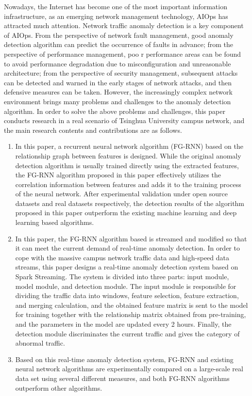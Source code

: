 \begin{abstract*}
  Nowadays, the Internet has become one of the most important information infrastructure, as an emerging network management technology, AIOps has attracted much attention. Network traffic anomaly detection is a key component of AIOps. From the perspective of network fault management, good anomaly detection algorithm can predict the occurrence of faults in advance; from the perspective of performance management, poo r performance areas can be found to avoid performance degradation due to misconfiguration and unreasonable architecture; from the perspective of security management, subsequent attacks can be detected and warned in the early stages of network attacks, and then defensive measures can be taken. However, the increasingly complex network environment brings many problems and challenges to the anomaly detection algorithm. 
  In order to solve the above problems and challenges, this paper conducts research in a real scenario of Tsinghua University campus network, and the main research contents and contributions are as follows.
  \begin{enumerate}
    \item In this paper, a recurrent neural network algorithm (FG-RNN) based on the relationship graph between features is designed. While the original anomaly detection algorithm is usually trained directly using the extracted features, the FG-RNN algorithm proposed in this paper effectively utilizes the correlation information between features and adds it to the training process of the neural network. After experimental validation under open source datasets and real datasets respectively, the detection results of the algorithm proposed in this paper outperform the existing machine learning and deep learning based algorithms.
    \item In this paper, the FG-RNN algorithm based is streamed and modified so that it can meet the current demand of real-time anomaly detection. In order to cope with the massive campus network traffic data and high-speed data streams, this paper designs a real-time anomaly detection system based on Spark Streaming. The system is divided into three parts: input module, model module, and detection module. The input module is responsible for dividing the traffic data into windows, feature selection, feature extraction, and merging calculation, and the obtained feature matrix is sent to the model for training together with the relationship matrix obtained from pre-training, and the parameters in the model are updated every 2 hours. Finally, the detection module discriminates the current traffic and gives the category of abnormal traffic.
    \item Based on this real-time anomaly detection system, FG-RNN and existing neural network algorithms are experimentally compared on a large-scale real data set using several different measures, and both FG-RNN algorithms outperform other algorithms.
  \end{enumerate}



\end{abstract*}
